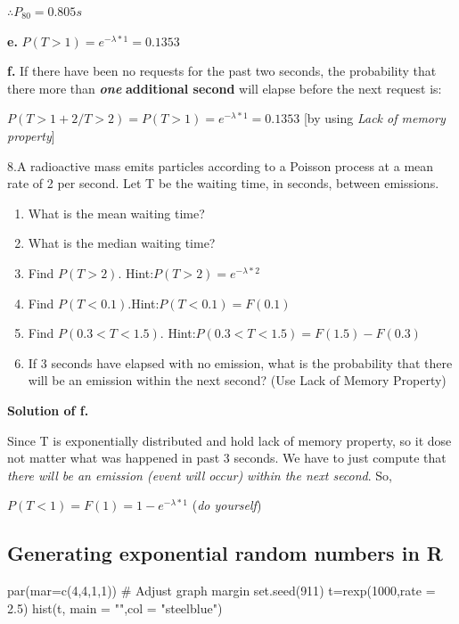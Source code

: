 \documentclass[
  11pt,
  letterpaper,
  DIV=11,
  numbers=noendperiod]{scrreprt}
\newenvironment{Shaded}{\begin{snugshade}}{\end{snugshade}}
\newcommand{\AttributeTok}[1]{\textcolor[rgb]{0.40,0.45,0.13}{#1}}
\newcommand{\CommentTok}[1]{\textcolor[rgb]{0.37,0.37,0.37}{#1}}
\newcommand{\DecValTok}[1]{\textcolor[rgb]{0.68,0.00,0.00}{#1}}
\newcommand{\FloatTok}[1]{\textcolor[rgb]{0.68,0.00,0.00}{#1}}
\newcommand{\FunctionTok}[1]{\textcolor[rgb]{0.28,0.35,0.67}{#1}}
\newcommand{\NormalTok}[1]{\textcolor[rgb]{0.00,0.23,0.31}{#1}}
\newcommand{\OtherTok}[1]{\textcolor[rgb]{0.00,0.23,0.31}{#1}}
\newcommand{\StringTok}[1]{\textcolor[rgb]{0.13,0.47,0.30}{#1}}
\providecommand{\tightlist}{%
  \setlength{\itemsep}{0pt}\setlength{\parskip}{0pt}}
\begin{document}
\(\therefore P_{80}=0.805 s\)

\textbf{e.} \(P(T>1)=e^{-\lambda *1}=0.1353\)

\textbf{f.} If there have been no requests for the past two seconds, the
probability that there more than \textbf{\emph{one}} \textbf{additional
second} will elapse before the next request is:

\(P(T>1+2 /T>2)=P(T>1)=e^{-\lambda *1}=0.1353\) {[}by using \emph{Lack
of memory property}{]}

8.A radioactive mass emits particles according to a Poisson process at a
mean rate of 2 per second. Let T be the waiting time, in seconds,
between emissions.

\begin{enumerate}
\def\labelenumi{\alph{enumi}.}
\tightlist
\item
  What is the mean waiting time?
\item
  What is the median waiting time?
\item
  Find \(P(T > 2)\). Hint:\(P(T > 2)=e^{-\lambda *2}\)
\item
  Find \(P(T < 0.1)\).Hint:\(P(T < 0.1)=F(0.1)\)
\item
  Find \(P(0.3< T < 1.5)\). Hint:\(P(0.3< T < 1.5)=F(1.5)-F(0.3)\)
\item
  If 3 seconds have elapsed with no emission, what is the probability
  that there will be an emission within the next second? (Use Lack of
  Memory Property)
\end{enumerate}

\textbf{Solution of f.}

Since T is exponentially distributed and hold lack of memory property,
so it dose not matter what was happened in past 3 seconds. We have to
just compute that \emph{there will be an emission (event will occur)
within the next second}. So,

\(P(T<1)=F(1)=1-e^{-\lambda*1}\) (\emph{do yourself})

\subsection{Generating exponential random numbers in
R}\label{generating-exponential-random-numbers-in-r}

\begin{Shaded}
\begin{Highlighting}[]
\FunctionTok{par}\NormalTok{(}\AttributeTok{mar=}\FunctionTok{c}\NormalTok{(}\DecValTok{4}\NormalTok{,}\DecValTok{4}\NormalTok{,}\DecValTok{1}\NormalTok{,}\DecValTok{1}\NormalTok{)) }\CommentTok{\# Adjust graph margin}
\FunctionTok{set.seed}\NormalTok{(}\DecValTok{911}\NormalTok{) }
\NormalTok{t}\OtherTok{=}\FunctionTok{rexp}\NormalTok{(}\DecValTok{1000}\NormalTok{,}\AttributeTok{rate =} \FloatTok{2.5}\NormalTok{)}
\FunctionTok{hist}\NormalTok{(t, }\AttributeTok{main =} \StringTok{""}\NormalTok{,}\AttributeTok{col =} \StringTok{"steelblue"}\NormalTok{)}
\end{Highlighting}
\end{Shaded}
\end{document}
